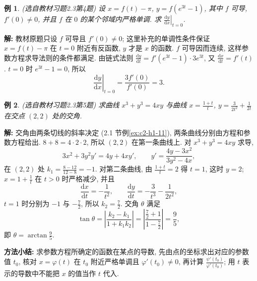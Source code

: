 \documentclass[UTF8,openany]{ctexbook}
\theoremstyle{chinesetextbook}
\newtheorem{example}{例}[section]
\newenvironment{cnsolution}{\par\indent\textbf{解:} \ignorespaces}{\par}
\newcommand{\dd}{\mathrm d}
\begin{document}
\begin{example}\label{ex:c2-h3-4}
\textnormal{(选自教材习题2.3第4题)} 设 $x=f(t)-\pi$, $y=f\left(e^{3t}-1\right)$, 其中 $f$ 可导, $f'(0)\ne0$, 并且 $f$ 在 $0$ 的某个邻域内严格单调. 求 $\displaystyle\left.\frac{\dd y}{\dd x}\right|_{t=0}$.
\end{example}
\begin{cnsolution}
教材原题只设 $f$ 可导且 $f'(0)\ne0$; 这里补充的单调性条件保证 $x=f(t)-\pi$ 在 $t=0$ 附近有反函数, $y$ 才是 $x$ 的函数. $f$ 可导因而连续, 这样参数方程求导法则的条件都满足. 由链式法则 $\displaystyle\frac{\dd y}{\dd t}=f'\left(e^{3t}-1\right)\cdot3e^{3t}$, 又 $\displaystyle\frac{\dd x}{\dd t}=f'(t)$. $t=0$ 时 $e^{3t}-1=0$, 所以
\[
\left.\frac{\dd y}{\dd x}\right|_{t=0}=\frac{3f'(0)}{f'(0)}=3.
\]
\end{cnsolution}
\begin{example}\label{ex:c2-h3-5}
\textnormal{(选自教材习题2.3第5题)} 求曲线 $x^3+y^3=4xy$ 与曲线 $\displaystyle x=\frac{1+t}t$, $\displaystyle y=\frac3{2t^2}+\frac1{2t}$ 在交点 $(2,2)$ 处的交角.
\end{example}
\begin{cnsolution}
交角由两条切线的斜率决定 (2.1 节例\ref{ex:c2-h1-11}), 两条曲线分别由方程和参数方程给出. $8+8=4\cdot2\cdot2$, 所以 $(2,2)$ 在第一条曲线上. 对 $x^3+y^3=4xy$ 求导,
\[
3x^2+3y^2y'=4y+4xy',\qquad y'=\frac{4y-3x^2}{3y^2-4x},
\]
在 $(2,2)$ 处 $\displaystyle k_1=\frac{8-12}{12-8}=-1$. 对第二条曲线, 由 $\displaystyle\frac{1+t}t=2$ 得 $t=1$, 这时 $y=2$; $\displaystyle x=1+\frac1t$ 在 $t>0$ 时严格减少, 并且
\[
\frac{\dd x}{\dd t}=-\frac1{t^2},\qquad\frac{\dd y}{\dd t}=-\frac3{t^3}-\frac1{2t^2},
\]
$t=1$ 时分别为 $-1$ 与 $\displaystyle-\frac72$, 所以 $\displaystyle k_2=\frac72$. 交角 $\theta$ 满足
\[
\tan\theta=\left|\frac{k_2-k_1}{1+k_1k_2}\right|=\left|\frac{\frac72+1}{1-\frac72}\right|=\frac95,
\]
即 $\displaystyle\theta=\arctan\frac95$.
\end{cnsolution}
\par\indent\textbf{方法小结:} 求参数方程所确定的函数在某点的导数, 先由点的坐标求出对应的参数值 $t_0$, 核对 $x=\varphi(t)$ 在 $t_0$ 附近严格单调且 $\varphi'(t_0)\ne0$, 再计算 $\displaystyle\frac{\psi'(t_0)}{\varphi'(t_0)}$; 用 $t$ 表示的导数中不能把 $x$ 的值当作 $t$ 代入.
\end{document}
